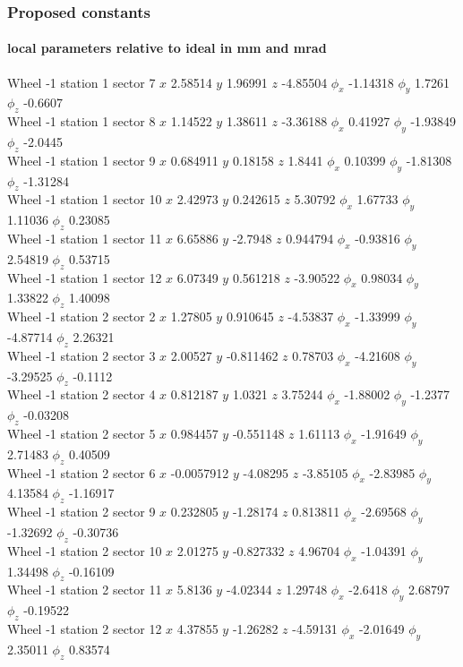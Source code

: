 \documentclass[compress]{beamer}
\begin{document}
\begin{frame}
\frametitle{Proposed constants}
\framesubtitle{local parameters relative to ideal in mm and mrad}

\tiny

Wheel -1 station 1 sector 7 $x$ 2.58514 $y$ 1.96991 $z$ -4.85504 $\phi_x$ -1.14318 $\phi_y$ 1.7261 $\phi_z$ -0.6607 \\
Wheel -1 station 1 sector 8 $x$ 1.14522 $y$ 1.38611 $z$ -3.36188 $\phi_x$ 0.41927 $\phi_y$ -1.93849 $\phi_z$ -2.0445 \\
Wheel -1 station 1 sector 9 $x$ 0.684911 $y$ 0.18158 $z$ 1.8441 $\phi_x$ 0.10399 $\phi_y$ -1.81308 $\phi_z$ -1.31284 \\
Wheel -1 station 1 sector 10 $x$ 2.42973 $y$ 0.242615 $z$ 5.30792 $\phi_x$ 1.67733 $\phi_y$ 1.11036 $\phi_z$ 0.23085 \\
Wheel -1 station 1 sector 11 $x$ 6.65886 $y$ -2.7948 $z$ 0.944794 $\phi_x$ -0.93816 $\phi_y$ 2.54819 $\phi_z$ 0.53715 \\
Wheel -1 station 1 sector 12 $x$ 6.07349 $y$ 0.561218 $z$ -3.90522 $\phi_x$ 0.98034 $\phi_y$ 1.33822 $\phi_z$ 1.40098 \\
Wheel -1 station 2 sector 2 $x$ 1.27805 $y$ 0.910645 $z$ -4.53837 $\phi_x$ -1.33999 $\phi_y$ -4.87714 $\phi_z$ 2.26321 \\
Wheel -1 station 2 sector 3 $x$ 2.00527 $y$ -0.811462 $z$ 0.78703 $\phi_x$ -4.21608 $\phi_y$ -3.29525 $\phi_z$ -0.1112 \\
Wheel -1 station 2 sector 4 $x$ 0.812187 $y$ 1.0321 $z$ 3.75244 $\phi_x$ -1.88002 $\phi_y$ -1.2377 $\phi_z$ -0.03208 \\
Wheel -1 station 2 sector 5 $x$ 0.984457 $y$ -0.551148 $z$ 1.61113 $\phi_x$ -1.91649 $\phi_y$ 2.71483 $\phi_z$ 0.40509 \\
Wheel -1 station 2 sector 6 $x$ -0.0057912 $y$ -4.08295 $z$ -3.85105 $\phi_x$ -2.83985 $\phi_y$ 4.13584 $\phi_z$ -1.16917 \\
Wheel -1 station 2 sector 9 $x$ 0.232805 $y$ -1.28174 $z$ 0.813811 $\phi_x$ -2.69568 $\phi_y$ -1.32692 $\phi_z$ -0.30736 \\
Wheel -1 station 2 sector 10 $x$ 2.01275 $y$ -0.827332 $z$ 4.96704 $\phi_x$ -1.04391 $\phi_y$ 1.34498 $\phi_z$ -0.16109 \\
Wheel -1 station 2 sector 11 $x$ 5.8136 $y$ -4.02344 $z$ 1.29748 $\phi_x$ -2.6418 $\phi_y$ 2.68797 $\phi_z$ -0.19522 \\
Wheel -1 station 2 sector 12 $x$ 4.37855 $y$ -1.26282 $z$ -4.59131 $\phi_x$ -2.01649 $\phi_y$ 2.35011 $\phi_z$ 0.83574 \\

\end{frame}
\end{document}

